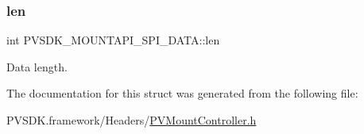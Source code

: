 \subsubsection{\texorpdfstring{len}{len}}
{\footnotesize\ttfamily int P\+V\+S\+D\+K\+\_\+\+M\+O\+U\+N\+T\+A\+P\+I\+\_\+\+S\+P\+I\+\_\+\+D\+A\+T\+A\+::len}



Data length. 



The documentation for this struct was generated from the following file\+:\begin{DoxyCompactItemize}
\item 
P\+V\+S\+D\+K.\+framework/\+Headers/\hyperlink{_p_v_mount_controller_8h}{P\+V\+Mount\+Controller.\+h}\end{DoxyCompactItemize}

